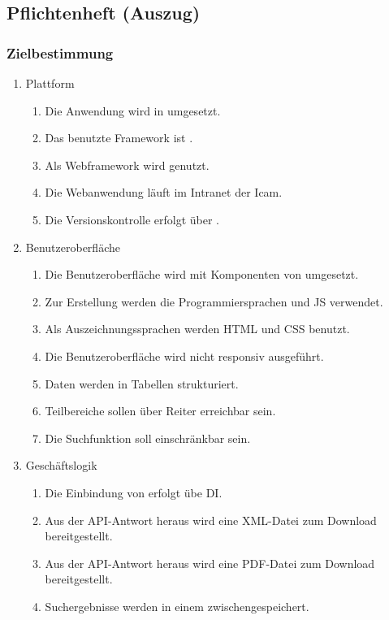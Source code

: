 \subsection{Pflichtenheft (Auszug)}
\label{app:Pflichtenheft}

\subsubsection*{Zielbestimmung}
\begin{enumerate}
    \item Plattform
        \begin{enumerate}
            \item Die Anwendung wird in  umgesetzt.
            \item Das benutzte Framework ist .
            \item Als Webframework wird  genutzt.
            \item Die Webanwendung läuft im Intranet der \acs{Icam}.
            \item Die Versionskontrolle erfolgt über .
        \end{enumerate}
    \item Benutzeroberfläche
        \begin{enumerate}
            \item Die Benutzeroberfläche wird mit Komponenten von  umgesetzt.
            \item Zur Erstellung werden die Programmiersprachen  und \acs{JS} verwendet.
            \item Als Auszeichnungssprachen werden \acs{HTML} und \acs{CSS} benutzt.
            \item Die Benutzeroberfläche wird nicht responsiv ausgeführt.
            \item Daten werden in Tabellen strukturiert.
            \item Teilbereiche sollen über Reiter erreichbar sein.
            \item Die Suchfunktion soll einschränkbar sein.
        \end{enumerate}
    \item Geschäftslogik
        \begin{enumerate}
            \item Die Einbindung von  erfolgt übe \acs{DI}.
            \item Aus der \acs{API}-Antwort heraus wird eine \acs{XML}-Datei zum Download bereitgestellt.
            \item Aus der \acs{API}-Antwort heraus wird eine \acs{PDF}-Datei zum Download bereitgestellt.
            \item Suchergebnisse werden in einem  zwischengespeichert.
        \end{enumerate}
\end{enumerate}